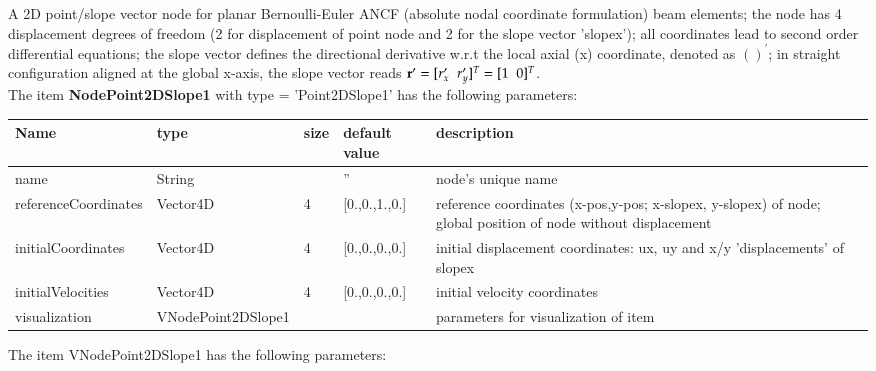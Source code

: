 A 2D point/slope vector node for planar Bernoulli-Euler ANCF (absolute nodal coordinate formulation) beam elements; the node has 4 displacement degrees of freedom (2 for displacement of point node and 2 for the slope vector 'slopex'); all coordinates lead to second order differential equations; the slope vector defines the directional derivative w.r.t the local axial (x) coordinate, denoted as $()^\prime$; in straight configuration aligned at the global x-axis, the slope vector reads $\mathbf{r}^\prime=[r_x^\prime\;\;r_y^\prime]^T=[1\;\;0]^T$.
 \\\vspace{12pt} \noindent The item {\bf NodePoint2DSlope1} with type = 'Point2DSlope1' has the following parameters:\vspace{-1cm}\\ 
\begin{center}
  \footnotesize
  \begin{longtable}{| p{4.5cm} | p{2.5cm} | p{0.5cm} | p{2.5cm} | p{6cm} |}
    \hline
    \bf Name & \bf type & \bf size & \bf default value & \bf description \\ \hline
    name &     String &      &     '' &     node's unique name\\ \hline
    referenceCoordinates &     Vector4D &     4 &     [0.,0.,1.,0.] &     reference coordinates (x-pos,y-pos; x-slopex, y-slopex) of node; global position of node without displacement\\ \hline
    initialCoordinates &     Vector4D &     4 &     [0.,0.,0.,0.] &     initial displacement coordinates: ux, uy and x/y 'displacements' of slopex\\ \hline
    initialVelocities &     Vector4D &     4 &     [0.,0.,0.,0.] &     initial velocity coordinates\\ \hline
    visualization & VNodePoint2DSlope1 & & & parameters for visualization of item \\ \hline
	  \end{longtable}
	\end{center}
The item VNodePoint2DSlope1 has the following parameters:\vspace{-1cm}\\ 
